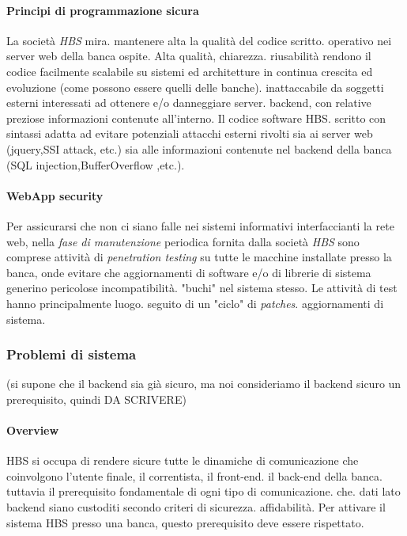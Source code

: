 	\paragraph{Principi di programmazione sicura}

La società \emph{HBS} mira. mantenere alta la qualità del codice scritto. operativo nei server web della banca ospite. Alta qualità, chiarezza. riusabilità rendono il codice facilmente scalabile su sistemi ed architetture in continua crescita ed evoluzione (come possono essere quelli delle banche). inattaccabile da soggetti esterni interessati ad ottenere e/o danneggiare server. backend, con relative preziose informazioni contenute all'interno.
 Il codice software HBS. scritto con sintassi adatta ad evitare potenziali attacchi esterni rivolti sia ai server web (jquery,SSI attack, etc.) sia alle informazioni contenute nel backend della banca (SQL injection,BufferOverflow ,etc.).

	\paragraph{WebApp security}
Per assicurarsi che non ci siano falle nei sistemi informativi interfaccianti la rete web, nella \emph{fase di manutenzione} periodica fornita dalla società \emph{HBS}  sono comprese attività di \emph{penetration testing} su tutte le macchine installate presso la banca, onde evitare che aggiornamenti di software e/o di librerie di sistema generino pericolose incompatibilità. "buchi" nel sistema stesso. Le attività di test hanno principalmente luogo. seguito di un "ciclo" di \emph{patches}. aggiornamenti di sistema.





\subsubsection{Problemi di sistema }
(si supone che il backend sia già sicuro, ma noi consideriamo il backend sicuro un prerequisito, quindi DA SCRIVERE)
\paragraph{Overview}	HBS si occupa di rendere sicure tutte le dinamiche di comunicazione che coinvolgono l'utente finale, il correntista, il front-end. il back-end della banca. tuttavia il prerequisito fondamentale di ogni tipo di comunicazione. che. dati lato backend siano custoditi secondo criteri di sicurezza. affidabilità. Per attivare il sistema HBS presso una banca, questo prerequisito deve essere rispettato.
















